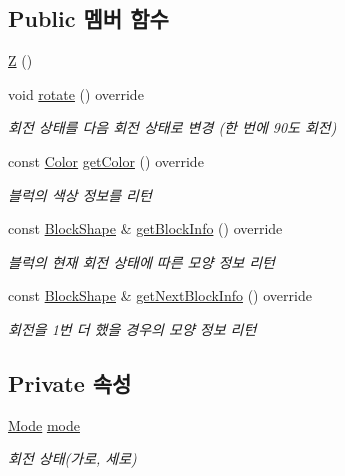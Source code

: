 \subsection*{Public 멤버 함수}
\begin{DoxyCompactItemize}
\item 
\mbox{\hyperlink{class_z_a199d7267ca3200d8c124955f710ec788}{Z}} ()
\item 
void \mbox{\hyperlink{class_z_aa2d629f1ad269cf21fe06b1e83ed70fa}{rotate}} () override
\begin{DoxyCompactList}\small\item\em 회전 상태를 다음 회전 상태로 변경 (한 번에 90도 회전) \end{DoxyCompactList}\item 
const \mbox{\hyperlink{class_block_ad054b4ac51df79aa910040b2a2fdf7b5}{Color}} \mbox{\hyperlink{class_z_a75f1e882dd5fb52b23bbd691da1e306e}{get\+Color}} () override
\begin{DoxyCompactList}\small\item\em 블럭의 색상 정보를 리턴 \end{DoxyCompactList}\item 
const \mbox{\hyperlink{class_block_aca5d951639f113e2ebd7856209d6b9ab}{Block\+Shape}} \& \mbox{\hyperlink{class_z_a95cca7076b1d1744d099f2a7db67fbf1}{get\+Block\+Info}} () override
\begin{DoxyCompactList}\small\item\em 블럭의 현재 회전 상태에 따른 모양 정보 리턴 \end{DoxyCompactList}\item 
const \mbox{\hyperlink{class_block_aca5d951639f113e2ebd7856209d6b9ab}{Block\+Shape}} \& \mbox{\hyperlink{class_z_a6891b8f72f62e7bb3a606b0d8fc96c38}{get\+Next\+Block\+Info}} () override
\begin{DoxyCompactList}\small\item\em 회전을 1번 더 했을 경우의 모양 정보 리턴 \end{DoxyCompactList}\end{DoxyCompactItemize}
\subsection*{Private 속성}
\begin{DoxyCompactItemize}
\item 
\mbox{\hyperlink{class_block_a33a96023993478ad4b52426188454765}{Mode}} \mbox{\hyperlink{class_z_a8324fb6e9f23196a9649ab838aabcc74}{mode}}
\begin{DoxyCompactList}\small\item\em 회전 상태(가로, 세로) \end{DoxyCompactList}\end{DoxyCompactItemize}
